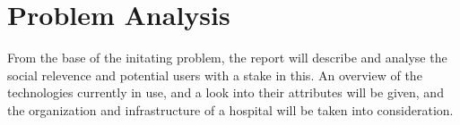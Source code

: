 \chapter{Problem Analysis} \label{cha:problem_analysis}

From the base of the initating problem, the report will describe and analyse the social relevence and potential users with a stake in this. An overview of the technologies currently in use, and a look into their attributes will be given, and the organization and infrastructure of a hospital will be taken into consideration. 










